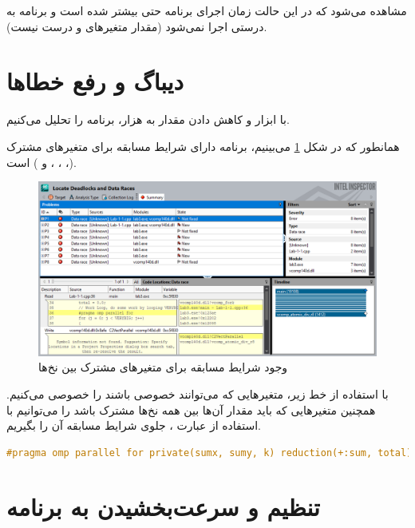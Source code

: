 \documentclass{HW}
\begin{document}
مشاهده می‌شود که در این حالت زمان اجرای برنامه حتی بیشتر شده است و برنامه به درستی اجرا نمی‌شود (مقدار متغیرهای  و  درست نیست).

\section{دیباگ و رفع خطاها}

با ابزار  و کاهش دادن مقدار  به هزار، برنامه را تحلیل می‌کنیم.

همانطور که در شکل
\ref{fig:datarace}
می‌بینیم، برنامه دارای شرایط مسابقه برای متغیرهای مشترک (، ، ،  و ) است.

\begin{figure}[ht!]
\begin{center}
	\includegraphics[width=15cm]{images/datarace}
\end{center}
\caption{وجود شرایط مسابقه برای متغیرهای مشترک بین نخ‌ها}
\label{fig:datarace}
\end{figure}

با استفاده از خط زیر، متغیرهایی که می‌توانند خصوصی باشند را خصوصی می‌کنیم. همچنین متغیرهایی که باید مقدار آن‌ها بین همه نخ‌ها مشترک باشد را می‌توانیم با استفاده از عبارت ، جلوی شرایط مسابقه آن را بگیریم.

\begin{latin}
\begin{lstlisting}[language=C]
#pragma omp parallel for private(sumx, sumy, k) reduction(+:sum, total)
\end{lstlisting}
\end{latin}


\section{تنظیم و سرعت‌بخشیدن به برنامه }
\end{document}
